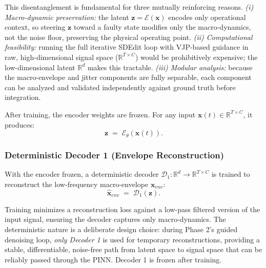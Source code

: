 \documentclass[conference]{IEEEtran}
\newcommand{\Enc}{\mathcal{E}}
\newcommand{\DecOne}{\mathcal{D}_1}
\newcommand{\z}{\mathbf{z}}
\newcommand{\x}{\mathbf{x}}
\begin{document}
This disentanglement is fundamental for three mutually reinforcing reasons. \emph{(i) Macro-dynamic preservation:} the latent $\z = \Enc(\x)$ encodes only operational context, so steering $\z$ toward a faulty state modifies only the macro-dynamics, not the noise floor, preserving the physical operating point. \emph{(ii) Computational feasibility:} running the full iterative SDEdit loop with VJP-based guidance in raw, high-dimensional signal space ($\mathbb{R}^{T\times C}$) would be prohibitively expensive; the low-dimensional latent $\mathbb{R}^d$ makes this tractable. \emph{(iii) Modular analysis:} because the macro-envelope and jitter components are fully separable, each component can be analyzed and validated independently against ground truth before integration.

After training, the encoder weights are frozen. For any input $\x(t)\in\mathbb{R}^{T\times C}$, it produces:
\begin{equation}
  \z \;=\; \Enc_\theta\!\left(\x(t)\right).
  \label{eq:encoder}
\end{equation}


\subsubsection{Deterministic Decoder 1 (Envelope Reconstruction)}

With the encoder frozen, a deterministic decoder $\DecOne:\mathbb{R}^d\to\mathbb{R}^{T\times C}$ is trained to reconstruct the low-frequency macro-envelope $\x_{env}$:
\begin{equation}
  \hat{\x}_{env} \;=\; \DecOne(\z).
  \label{eq:dec1}
\end{equation}


Training minimizes a reconstruction loss against a low-pass filtered version of the input signal, ensuring the decoder captures only macro-dynamics. The deterministic nature is a deliberate design choice: during Phase 2's guided denoising loop, \emph{only Decoder 1} is used for temporary reconstructions, providing a stable, differentiable, noise-free path from latent space to signal space that can be reliably passed through the PINN. Decoder 1 is frozen after training.
\end{document}
